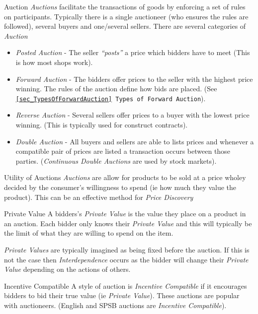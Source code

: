 \documentclass[11pt,a4paper]{article}
\begin{document}
  \begin{definition}{Auction}
    \textit{Auctions} facilitate the transactions of goods by enforcing a set of rules on participants. Typically there is a single auctioneer (who ensures the rules are followed), several buyers and one/several sellers. There are several categories of \textit{Auction}
    \begin{itemize}
      \item \textit{Posted Auction} - The seller \textit{``posts''} a price which bidders have to meet (This is how most shops work).
      \item \textit{Forward Auction} - The bidders offer prices to the seller with the highest price winning. The rules of the auction define how bids are placed. (See \texttt{\ref{sec_TypesOfForwardAuction} Types of Forward Auction}).
      \item \textit{Reverse Auction} - Several sellers offer prices to a buyer with the lowest price winning. (This is typically used for construct contracts).
      \item \textit{Double Auction} - All buyers and sellers are able to lists prices and whenever a compatible pair of prices are listed a transaction occurs between those parties. (\textit{Continuous Double Auctions} are used by stock markets).
    \end{itemize}
  \end{definition}

  \begin{remark}{Utility of Auctions}
    \textit{Auctions} are allow for products to be sold at a price wholey decided by the consumer's willingness to spend (ie how much they value the product). This can be an effective method for \textit{Price Discovery}
  \end{remark}

  \begin{definition}{Private Value}
    A bidders's \textit{Private Value} is the value they place on a product in an auction. Each bidder only knows their \textit{Private Value} and this will typically be the limit of what they are willing to spend on the item.
    \par \textit{Private Values} are typically imagined as being fixed before the auction. If this is not the case then \textit{Interdependence} occurs as the bidder will change their \textit{Private Value} depending on the actions of others.
  \end{definition}

  \begin{definition}{Incentive Compatible}
    A style of auction is \textit{Incentive Compatible} if it encourages bidders to bid their true value (ie \textit{Private Value}). These auctions are popular with auctioneers. (English and SPSB auctions are \textit{Incentive Compatible}).
  \end{definition}
\end{document}
